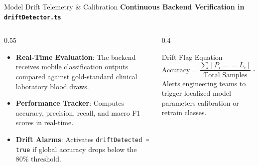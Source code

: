 \documentclass[aspectratio=169]{beamer}
\begin{document}
\begin{frame}{Model Drift Telemetry \& Calibration}
    \textbf{Continuous Backend Verification in \texttt{driftDetector.ts}}
    \begin{columns}[T]
        \begin{column}{0.55\textwidth}
            \begin{itemize}
                \item \textbf{Real-Time Evaluation}: The backend receives mobile classification outputs compared against gold-standard clinical laboratory blood draws.
                \item \textbf{Performance Tracker}: Computes accuracy, precision, recall, and macro F1 scores in real-time.
                \item \textbf{Drift Alarms}: Activates \texttt{driftDetected = true} if global accuracy drops below the 80\% threshold.
            \end{itemize}
        \end{column}
        \begin{column}{0.4\textwidth}
            \begin{block}{Drift Flag Equation}
                \begin{equation*}
                    \text{Accuracy} = \frac{\sum [P_i == L_i]}{\text{Total Samples}} < 0.80
                \end{equation*}
                Alerts engineering teams to trigger localized model parameters calibration or retrain classes.
            \end{block}
        \end{column}
    \end{columns}
\end{frame}
\end{document}
